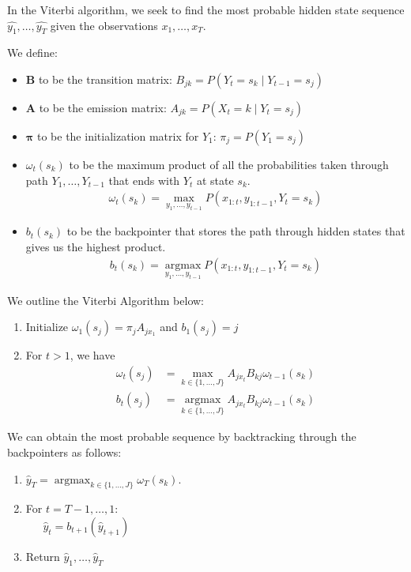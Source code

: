 \documentclass[11pt,addpoints,answers]{exam}
\newcommand \argmax {\operatorname*{argmax}}
\begin{document}
\begin{questions}
In the Viterbi algorithm, we seek to find the most probable hidden state sequence $\hat{y_1}, \dots, \hat{y_T}$ given the observations $x_1,\dots,x_T$. 

We define:
\begin{itemize}
    \item $\mathbf{B}$ to be the transition matrix: $B_{jk} = P(Y_{t} = s_{k} \mid Y_{t-1} = s_{j})$
    \item $\mathbf{A}$ to be the emission matrix: $A_{jk} = P(X_{t} = k \mid Y_{t} = s_{j})$
    \item $\boldsymbol{\pi}$ to be the initialization matrix for $Y_1$: $\pi_j = P(Y_1 = s_j)$
    \item $\omega_t(s_k)$ to be the maximum product of all the probabilities taken through path $Y_1, \dots, Y_{t-1}$ that ends with $Y_t$ at state $s_k$.
    \begin{align}
    \omega_t(s_k) = \max_{y_1,\dots, y_{t-1}} P(x_{1:t},y_{1:t-1},Y_t=s_k)    
    \end{align}
    \item $b_t(s_k)$ to be the backpointer that stores the path through hidden states that gives us the highest product.
    \begin{align}
    b_t(s_k) = \argmax_{y_1,\dots, y_{t-1}} P(x_{1:t},y_{1:t-1},Y_t=s_k)    
    \end{align}
\end{itemize}

We outline the Viterbi Algorithm below:
\begin{enumerate}
    \item Initialize $\omega_1(s_j) = \pi_{j} A_{jx_{1}}$ and $b_1(s_j) = j$
    \item For $t > 1$, we have 
    \begin{align*}
        \omega_t(s_j) &= \max_{k \in \{1,\dots,J\}} A_{j x_{t}} B_{kj} \omega_{t-1}(s_k) \\
        b_t(s_j) &= \argmax_{k \in \{1,\dots,J\}} A_{j x_{t}} B_{kj} \omega_{t-1}(s_k)
    \end{align*}
\end{enumerate}

We can obtain the most probable sequence by backtracking through the backpointers as follows:
\begin{enumerate}
    \item $\hat{y}_T = \argmax_{k \in \{1,\dots,J\}} \omega_T(s_k)$. 
    \item For $t = T-1,\dots,1$: \\
    $~~~~~~~\hat{y}_{t} = b_{t+1}(\hat{y}_{t+1})$
    \item Return $\hat{y}_1, \dots, \hat{y}_T$
\end{enumerate}


\end{questions}
\end{document}
